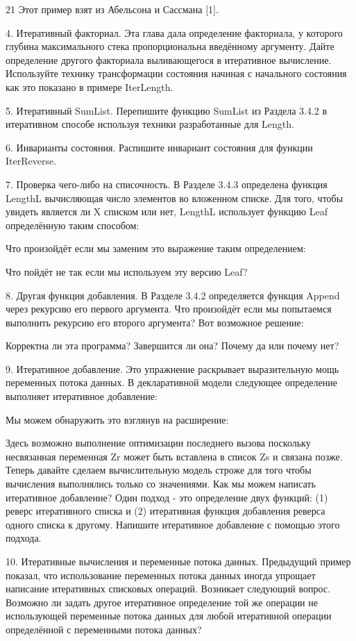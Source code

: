 21 Этот пример взят из Абельсона и Сассмана [1].

4. Итеративный факториал. Эта глава дала определение факториала, у которого глубина максимального стека пропорциональна введённому аргументу. Дайте определение другого факториала выливающегося в итеративное вычисление. Используйте технику трансформации состояния начиная с начального состояния как это показано в примере IterLength.

5. Итеративный SumList. Перепишите функцию SumList из Раздела 3.4.2 в итеративном способе используя техники разработанные для Length.

6. Инварианты состояния. Распишите инвариант состояния для функции IterReverse.

7. Проверка чего-либо на списочность. В Разделе 3.4.3 определена функция LengthL вычисляющая число элементов во вложенном списке. Для того, чтобы увидеть является ли X списком или нет, LengthL использует функцию Leaf определённую таким способом:

Что произойдёт если мы заменим это выражение таким определением:

Что пойдёт не так если мы используем эту версию Leaf?

8. Другая функция добавления. В Разделе 3.4.2 определяется функция Append через рекурсию его первого аргумента. Что произойдёт если мы попытаемся выполнить рекурсию его второго аргумента? Вот возможное решение:

Корректна ли эта программа? Завершится ли она? Почему да или почему нет?

9. Итеративное добавление. Это упражнение раскрывает выразительную мощь переменных потока данных. В декларативной модели следующее определение выполняет итеративное добавление:

Мы можем обнаружить это взглянув на расширение:

Здесь возможно выполнение оптимизации последнего вызова поскольку несвязанная переменная Zr может быть вставлена в список Zs и связана позже. Теперь давайте сделаем вычислительную модель строже для того чтобы вычисления выполнялись только со значениями. Как мы можем написать итеративное добавление? Один подход - это определение двух функций: (1) реверс итеративного списка и (2) итеративная функция добавления реверса одного списка к другому. Напишите итеративное добавление с помощью этого подхода.

10. Итеративные вычисления и переменные потока данных. Предыдущий пример показал, что использование переменных потока данных иногда упрощает написание итеративных списковых операций. Возникает следующий вопрос. Возможно ли задать другое итеративное определение той же операции не использующей переменные потока данных для любой итеративной операции определённой с переменными потока данных?

